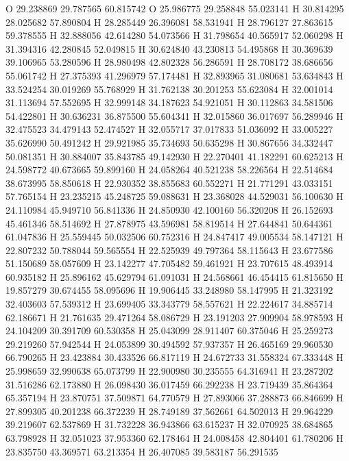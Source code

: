 \documentclass{article}
\begin{document}
O 29.238869 29.787565 60.815742 
O 25.986775 29.258848 55.023141 
H 30.814295 28.025682 57.890804 
H 28.285449 26.396081 58.531941 
H 28.796127 27.863615 59.378555 
H 32.888056 42.614280 54.073566 
H 31.798654 40.565917 52.060298 
H 31.394316 42.280845 52.049815 
H 30.624840 43.230813 54.495868 
H 30.369639 39.106965 53.280596 
H 28.980498 42.802328 56.286591 
H 28.708172 38.686656 55.061742 
H 27.375393 41.296979 57.174481 
H 32.893965 31.080681 53.634843 
H 33.524254 30.019269 55.768929 
H 31.762138 30.201253 55.623084 
H 32.001014 31.113694 57.552695 
H 32.999148 34.187623 54.921051 
H 30.112863 34.581506 54.422801 
H 30.636231 36.875500 55.604341 
H 32.015860 36.017697 56.289946 
H 32.475523 34.479143 52.474527 
H 32.055717 37.017833 51.036092 
H 33.005227 35.626990 50.491242 
H 29.921985 35.734693 50.635298 
H 30.867656 34.332447 50.081351 
H 30.884007 35.843785 49.142930 
H 22.270401 41.182291 60.625213 
H 24.598772 40.673665 59.899160 
H 24.058264 40.521238 58.226564 
H 22.514684 38.673995 58.850618 
H 22.930352 38.855683 60.552271 
H 21.771291 43.033151 57.765154 
H 23.235215 45.248725 59.088631 
H 23.368028 44.529031 56.100630 
H 24.110984 45.949710 56.841336 
H 24.850930 42.100160 56.320208 
H 26.152693 45.461346 58.514692 
H 27.878975 43.596981 58.819514 
H 27.644841 50.644361 61.047836 
H 25.559445 50.032506 60.752316 
H 24.847417 49.005534 58.147121 
H 22.807232 50.788044 59.565554 
H 22.525939 49.797364 58.115643 
H 23.677586 51.150689 58.057609 
H 23.142277 47.705482 59.461921 
H 23.707615 48.493914 60.935182 
H 25.896162 45.629794 61.091031 
H 24.568661 46.454415 61.815650 
H 19.857279 30.674455 58.095696 
H 19.906445 33.248980 58.147995 
H 21.323192 32.403603 57.539312 
H 23.699405 33.343779 58.557621 
H 22.224617 34.885714 62.186671 
H 21.761635 29.471264 58.086729 
H 23.191203 27.909904 58.978593 
H 24.104209 30.391709 60.530358 
H 25.043099 28.911407 60.375046 
H 25.259273 29.219260 57.942544 
H 24.053899 30.494592 57.937357 
H 26.465169 29.960530 66.790265 
H 23.423884 30.433526 66.817119 
H 24.672733 31.558324 67.333448 
H 25.998659 32.990638 65.073799 
H 22.900980 30.235555 64.316941 
H 23.287202 31.516286 62.173880 
H 26.098430 36.017459 66.292238 
H 23.719439 35.864364 65.357194 
H 23.870751 37.509871 64.770579 
H 27.893066 37.288873 66.846699 
H 27.899305 40.201238 66.372239 
H 28.749189 37.562661 64.502013 
H 29.964229 39.219607 62.537869 
H 31.732228 36.943866 63.615237 
H 32.070925 38.684865 63.798928 
H 32.051023 37.953360 62.178464 
H 24.008458 42.804401 61.780206 
H 23.835750 43.369571 63.213354 
H 26.407085 39.583187 56.291535 
\end{document}

